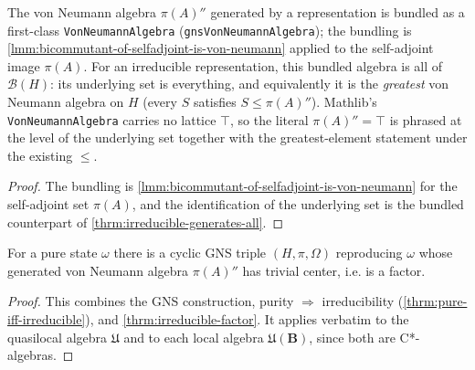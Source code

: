 \begin{theorem}
    \label{thrm:gns-generates-all-bundled}
    \leanok
    The von Neumann algebra $\pi(A)''$ generated by a representation is bundled as a first-class \texttt{VonNeumannAlgebra} (\texttt{gnsVonNeumannAlgebra}); the bundling is \ref{lmm:bicommutant-of-selfadjoint-is-von-neumann} applied to the self-adjoint image $\pi(A)$. For an irreducible representation, this bundled algebra is all of $\mathcal{B}(H)$: its underlying set is everything, and equivalently it is the \emph{greatest} von Neumann algebra on $H$ (every $S$ satisfies $S \le \pi(A)''$). Mathlib's \texttt{VonNeumannAlgebra} carries no lattice $\top$, so the literal $\pi(A)'' = \top$ is phrased at the level of the underlying set together with the greatest-element statement under the existing $\le$.
\end{theorem}
\begin{proof}
    \leanok
    The bundling is \ref{lmm:bicommutant-of-selfadjoint-is-von-neumann} for the self-adjoint set $\pi(A)$, and the identification of the underlying set is the bundled counterpart of \ref{thrm:irreducible-generates-all}.
\end{proof}

\begin{theorem}
    \label{thrm:pure-factor}
    \leanok
    For a pure state $\omega$ there is a cyclic GNS triple $(H, \pi, \Omega)$ reproducing $\omega$ whose generated von Neumann algebra $\pi(A)''$ has trivial center, i.e. is a factor.
\end{theorem}
\begin{proof}
    \leanok
    This combines the GNS construction, purity $\Rightarrow$ irreducibility (\ref{thrm:pure-iff-irreducible}), and \ref{thrm:irreducible-factor}. It applies verbatim to the quasilocal algebra $\mathfrak{U}$ and to each local algebra $\mathfrak{U}(\mathbf{B})$, since both are C*-algebras.
\end{proof}


